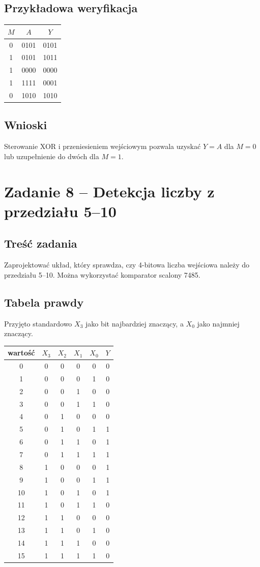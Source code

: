 \documentclass[12pt,a4paper]{article}
\begin{document}
\subsection{Przykładowa weryfikacja}
\begin{center}
\begin{tabular}{c|c|c}
\toprule
$M$&$A$&$Y$\\
\midrule
0&0101&0101\\
1&0101&1011\\
1&0000&0000\\
1&1111&0001\\
0&1010&1010\\
\bottomrule
\end{tabular}
\end{center}
\subsection{Wnioski}
Sterowanie XOR i przeniesieniem wejściowym pozwala uzyskać $Y=A$ dla $M=0$ lub uzupełnienie do dwóch dla $M=1$.
\section{Zadanie 8 -- Detekcja liczby z przedziału 5--10}
\subsection{Treść zadania}
Zaprojektować układ, który sprawdza, czy 4-bitowa liczba wejściowa należy do przedziału 5--10. Można wykorzystać komparator scalony 7485.
\subsection{Tabela prawdy}
Przyjęto standardowo $X_3$ jako bit najbardziej znaczący, a $X_0$ jako najmniej znaczący.
\begin{center}
\begin{tabular}{c|cccc|c}
\toprule
wartość&$X_3$&$X_2$&$X_1$&$X_0$&$Y$\\
\midrule
0&0&0&0&0&0\\
1&0&0&0&1&0\\
2&0&0&1&0&0\\
3&0&0&1&1&0\\
4&0&1&0&0&0\\
5&0&1&0&1&1\\
6&0&1&1&0&1\\
7&0&1&1&1&1\\
8&1&0&0&0&1\\
9&1&0&0&1&1\\
10&1&0&1&0&1\\
11&1&0&1&1&0\\
12&1&1&0&0&0\\
13&1&1&0&1&0\\
14&1&1&1&0&0\\
15&1&1&1&1&0\\
\bottomrule
\end{tabular}
\end{center}
\end{document}
